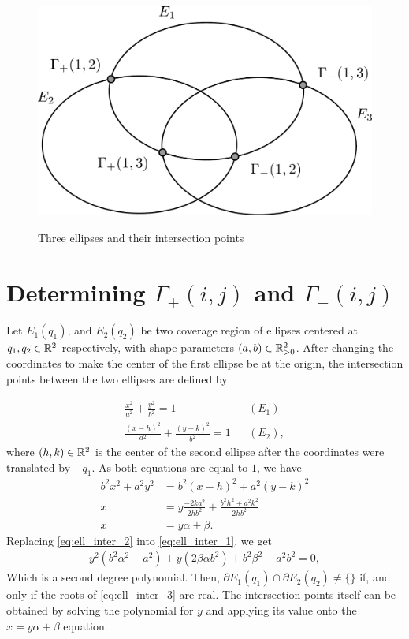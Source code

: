 \begin{figure}[H]
	\centering
	\caption{Three ellipses and their intersection points}
	\includegraphics[scale=.34]{tex/figures/3ellipses_intersect.pdf}
	\fautor
	\label{fig:3ellipses_intersect}
\end{figure}

\section{Determining $\Gamma_+(i,j)$ and $\Gamma_-(i,j)$}\label{section:ellipses_intersection}

Let $E_1(q_1)$, and $E_2(q_2)$ be two coverage region of ellipses centered at $q_1, q_2\in\mathbb{R}^2$ respectively, with shape parameters $(a, b)\in\mathbb{R}^2_{>0}$. After changing the coordinates to make the center of the first ellipse be at the origin, the intersection points between the two ellipses are defined by

\begin{align}
\frac{x^2}{a^2} + \frac{y^2}{b^2} = 1 && (E_1) \label{eq:ell_inter_1}\\
\frac{(x-h)^2}{a^2} + \frac{(y-k)^2}{b^2} = 1 && (E_2), \nonumber
\end{align}
where $(h,k)\in\mathbb{R}^2$ is the center of the second ellipse after the coordinates were translated by $-q_1$. As both equations are equal to $1$, we have
\begin{align}
    b^2x^2 + a^2y^2 &= b^2(x-h)^2 + a^2(y-k)^2 \nonumber\\
    x &= y\frac{-2ka^2}{2hb^2} + \frac{b^2h^2 + a^2k^2}{2hb^2} \nonumber\\
    x &= y\alpha + \beta.\label{eq:ell_inter_2}
\end{align}
Replacing \autoref{eq:ell_inter_2} into \autoref{eq:ell_inter_1}, we get
\begin{align}\label{eq:ell_inter_3}
y^2(b^2\alpha^2 + a^2) + y(2\beta\alpha b^2) + b^2\beta^2 -a^2b^2 = 0,
\end{align}
Which is a second degree polynomial. Then, $\partial E_1(q_1) \cap \partial E_2(q_2) \neq \{\}$ if, and only if the roots of \autoref{eq:ell_inter_3} are real. The intersection points itself can be obtained by solving the polynomial for $y$ and applying its value onto the $x=y\alpha + \beta$ equation.

